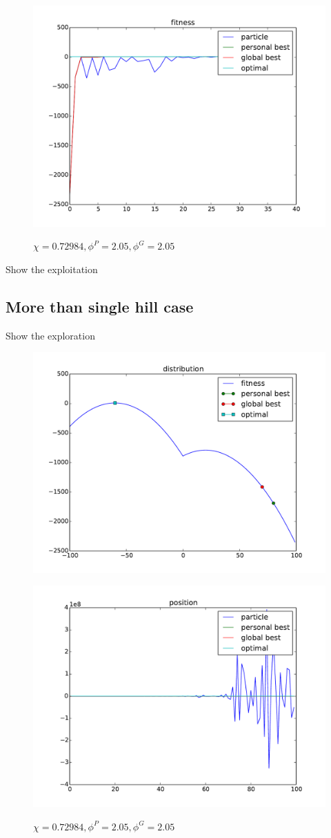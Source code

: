 \begin{figure}[ht]
\centering
\includegraphics[width=.7\linewidth]{./simfig/case1/fitness1-2} 
\label{fig:case1-2:fitness} 
\caption{$ \chi = 0.72984 , \phi^{P} = 2.05 , \phi^{G} = 2.05 $ }
\end{figure}

Show the exploitation


\subsection{More than single hill case}

Show the exploration

\begin{figure}[ht]
\centering
\includegraphics[width=.7\linewidth]{./simfig/case2/distribution2}
\label{fig:case2-1:distribution} 
\end{figure}

\begin{figure}[ht]
\centering
\includegraphics[width=.7\linewidth]{./simfig/case2/position2-1} 
\label{fig:case2-1:position}
\caption{$ \chi = 0.72984 , \phi^{P} = 2.05 , \phi^{G} = 2.05 $ }
\end{figure}

